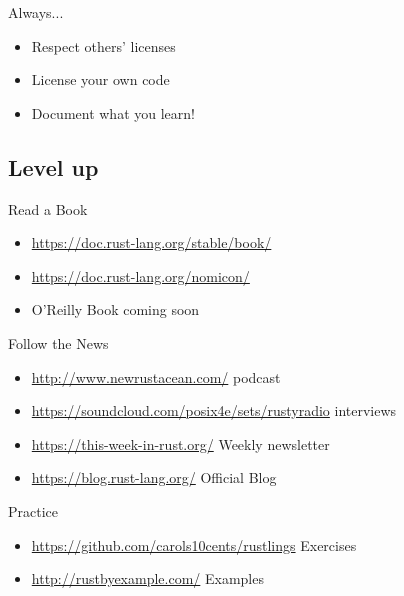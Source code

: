 \documentclass[xcolor={svgnames},hyperref]{beamer}
\begin{document}
    \begin{frame}
        Always...
        \begin{itemize}
            \item Respect others' licenses
            \item License your own code
            \item Document what you learn!
        \end{itemize}
    \end{frame}


\subsection{Level up}

    \begin{frame}
        Read a Book
        \begin{itemize}
            \item \url{https://doc.rust-lang.org/stable/book/}
            \item \url{https://doc.rust-lang.org/nomicon/}
            \item O'Reilly Book coming soon
        \end{itemize}
    \end{frame}

    \begin{frame}
        Follow the News
        \begin{itemize}
            \item \url{http://www.newrustacean.com/} podcast
            \item \url{https://soundcloud.com/posix4e/sets/rustyradio} interviews
            \item \url{https://this-week-in-rust.org/} Weekly newsletter
            \item \url{https://blog.rust-lang.org/} Official Blog
        \end{itemize}
    \end{frame}

    \begin{frame}
        Practice
        \begin{itemize}
            \item \url{https://github.com/carols10cents/rustlings} Exercises
            \item \url{http://rustbyexample.com/} Examples
        \end{itemize}
    \end{frame}
\end{document}
